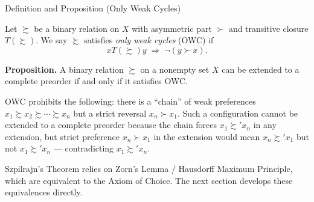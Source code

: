 \begin{definitionbox}{Definition and Proposition (Only Weak Cycles)}
\begin{definition}\label{def:owc}
Let $\succsim$ be a binary relation on $X$ with asymmetric part $\succ$ and
transitive closure $T(\succsim)$. We say $\succsim$ satisfies \emph{only weak
cycles} (OWC) if
\[
  xT(\succsim)y \;\Rightarrow\; \lnot(y \succ x).
\]

\medskip
\noindent\textbf{Proposition.} A binary relation $\succsim$ on a nonempty
set $X$ can be extended to a complete preorder if and only if it satisfies
OWC.
\end{definition}
\end{definitionbox}

\begin{remark*}
OWC prohibits the following: there is a ``chain'' of weak preferences
$x_1 \succsim x_2 \succsim \cdots \succsim x_n$ but a strict reversal
$x_n \succ x_1$. Such a configuration cannot be extended to a complete
preorder because the chain forces $x_1 \succsim' x_n$ in any extension, but
strict preference $x_n \succ x_1$ in the extension would mean
$x_n \succsim' x_1$ but not $x_1 \succsim' x_n$ — contradicting
$x_1 \succsim' x_n$.
\end{remark*}

\begin{remark*}[Transition to AC]
Szpilrajn's Theorem relies on Zorn's Lemma / Hausdorff Maximum Principle,
which are equivalent to the Axiom of Choice. The next section develops
these equivalences directly.
\end{remark*}
